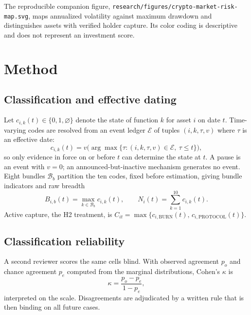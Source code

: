 \documentclass[10pt]{article}
\begin{document}
The reproducible companion figure, \texttt{research/figures/crypto-market-risk-map.svg}, maps annualized volatility against maximum drawdown and distinguishes assets with verified holder capture. Its color coding is descriptive and does not represent an investment score.

\section{Method}

\subsection{Classification and effective dating}
Let $c_{i,k}(t) \in \{0,1,\varnothing\}$ denote the state of function $k$ for asset $i$ on date $t$. Time-varying codes are resolved from an event ledger $\mathcal{E}$ of tuples $(i,k,\tau,v)$ where $\tau$ is an effective date:
\begin{equation}
c_{i,k}(t) = v\big(\arg\max\{\tau : (i,k,\tau,v) \in \mathcal{E},\ \tau \le t\}\big),
\end{equation}
so only evidence in force on or before $t$ can determine the state at $t$. A pause is an event with $v=0$; an announced-but-inactive mechanism generates no event. Eight bundles $\mathcal{B}_b$ partition the ten codes, fixed before estimation, giving bundle indicators and raw breadth
\begin{equation}
B_{i,b}(t) = \max_{k \in \mathcal{B}_b} c_{i,k}(t), \qquad
N_i(t) = \sum_{k=1}^{10} c_{i,k}(t).
\end{equation}
Active capture, the H2 treatment, is $C_{it} = \max\{c_{i,\mathrm{BURN}}(t),\, c_{i,\mathrm{PROTOCOL}}(t)\}$.

\subsection{Classification reliability}
A second reviewer scores the same cells blind. With observed agreement $p_o$ and chance agreement $p_e$ computed from the marginal distributions, Cohen's $\kappa$ \citep{cohen1960kappa} is
\begin{equation}
\kappa = \frac{p_o - p_e}{1 - p_e},
\end{equation}
interpreted on the \citet{landiskoch1977} scale. Disagreements are adjudicated by a written rule that is then binding on all future cases.
\end{document}
